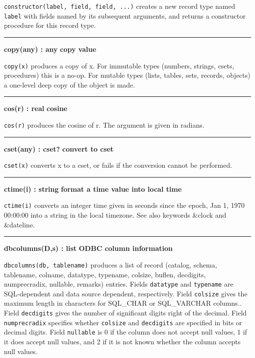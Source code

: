 \noindent
{}\texttt{constructor(label, field, field, ...)}
creates a new record type named \texttt{label} with fields named by its
subsequent arguments, and returns a constructor procedure for this
record type.

\bigskip
\hrule\vspace{0.1cm}
\noindent
{\bf copy(any) : any } \hfill {\bf copy value}\WarningNotThreadSafe

\noindent
{}\texttt{copy(x)} produces a copy of x. For immutable types
(numbers, strings, csets, procedures) this is a no-op. For mutable
types (lists, tables, sets, records, objects) a one-level deep copy of
the object is made.

\bigskip\hrule\vspace{0.1cm}
\noindent
{\bf cos(r) : real } \hfill {\bf cosine}

\noindent
{}\texttt{cos(r)} produces the cosine of r. The argument
is given in radians.

\bigskip\hrule\vspace{0.1cm}
\noindent
{\bf cset(any) : cset? } \hfill {\bf convert to cset}

\noindent
{}\texttt{cset(x)} converts x to a cset, or fails if the
conversion cannot be performed.

\bigskip\hrule\vspace{0.1cm}
\noindent
{\bf ctime(i) : string } \hfill {\bf format a time value into local time }

\noindent
{}\texttt{ctime(i)} converts an integer time
given in seconds since the epoch, Jan 1, 1970 00:00:00 into a string in
the local timezone. See also keywords \&clock and \&dateline.

\bigskip\hrule\vspace{0.1cm}
\noindent
{\bf dbcolumns(D,s) : list } \hfill {\bf ODBC column information}

\noindent
{}\texttt{dbcolumns(db, tablename)} produces a list of record
(catalog, schema, tablename, colname, datatype, typename, colsize,
buflen, decdigits, numprecradix, nullable, remarks) entries. Fields
\texttt{datatype} and \texttt{typename} are SQL-dependent and data
source dependent, respectively. Field \texttt{colsize} gives the
maximum length in characters for SQL\_CHAR or SQL\_VARCHAR columns..
Field \texttt{decdigits} gives the number of significant digits right
of the decimal. Field \texttt{numprecradix} specifies whether
\texttt{colsize} and \texttt{decdigits} are specified in bits or
decimal digits. Field \texttt{nullable} is 0 if the column does not
accept null values, 1 if it does accept null values, and 2 if it is not
known whether the column accepts null values.

